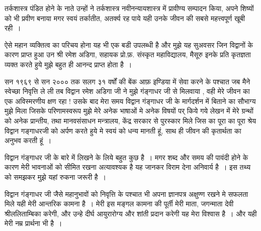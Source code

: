 {तर्कशास्त्र पंडित होने के नाते उन्हों ने तर्कशास्त्र नवीनन्यायशास्त्र में प्रावीण्य सम्पादन किया, अपने शिष्यों को भी प्रवीण बनाया मगर स्वयं तर्कातीत, अतर्क्य रह पाये यही उनके जीवन की सबसे महत्त्वपूर्ण खूबी रही~। 

ऐसे महान व्यक्तित्व का परिचय होना यह भी एक बडी उपलब्धी है और मुझे यह सुअवसर जिन विद्वानों के कारण प्राप्त हुआ उन श्री रमेश अडिगा, सहायक प्रो.फ़. संस्कृत महाविद्यालय, मैसूरु इनके प्रति कृतज्ञता व्यक्त करते हुये मुझे बहुत ही आनन्द प्राप्त होता है~। 

सन १९६९ से सन २००० तक सलग ३१ वर्षों की बेंक आफ़ इण्डिया में सेवा करने के पश्चात जब मैने स्वेच्छा निवृत्ति ले ली तब विद्वान रमेश अडिगा जी ने मुझे गंङ्गाधर जी से मिलवाया , वही मेरे जीवन का एक अविस्मरणीय क्षण रहा ! उसके बाद मेरा समय विद्वान गंङ्गाधर जी के मार्गदर्शन में बिताने का सौभाग्य मुझे मिला जिसके परिणामस्वरूप मुझे मेरे अनेक भाषाओं मे अनेक विषयों पर् किये गये लेखन में मेरे ग्रन्थों को अनेक प्रान्तीय, तथा मानवसंसाधन मन्त्रालय, केंद्र सरकार से पुरस्कार मिले जिस का पूरा का पूरा श्रेय विद्वान गङ्गाधरजी को अर्पण करते हुये मे स्वयं को धन्य मानती हूं, साथ ही जीवन की कृतार्थता का   अनुभव करती हूं~।

विद्वान गंङ्गाधर जी के बारे में लिखने के लिये बहुत कुछ है~।  मगर शब्द और समय की पावंदी होने के कारण मेरी भावनाओं को सीमित रखना अत्यावश्यक है यह जानकर विराम देना अनिवार्य है~। इस तथ्य को समझकर मुझे यहां रुकना जरूरी है~। 

विद्वान गंङ्गाधर जी जैसे महानुभावों को निवृत्ति के पश्चात भी अपना ज्ञानपत्र अक्षुण्ण रखने मे सफलता मिले यही मेरी आन्तरिक कामना है~। मेरी इस मङ्गल कामना की पूर्ती मेरी माता, जगन्माता देवी श्रीललिताम्बिका करेगी, और उन्हे दीर्घ आयुरारोग्य और शांती प्रदान करेगी यह मेरा विश्वास है~। और यही मेरी नम्र प्रार्थना भी है~।

\articleend
}
